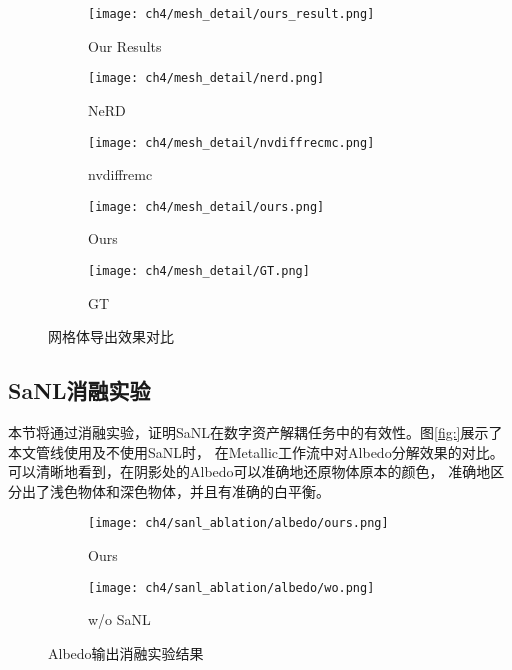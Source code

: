 \begin{figure}[H]
  \centering
  \begin{subfigure}[c]{0.32\textwidth}
    \centering
    \texttt{[image: ch4/mesh\_detail/ours\_result.png]}
    \caption{Our Results}
  \end{subfigure}
  \begin{subfigure}[c]{0.16\textwidth}
    \centering
    \texttt{[image: ch4/mesh\_detail/nerd.png]}
    \caption{NeRD}
  \end{subfigure}
  \hspace{0.1mm}
  \begin{subfigure}[c]{0.16\textwidth}
    \centering
    \texttt{[image: ch4/mesh\_detail/nvdiffrecmc.png]}
    \caption{nvdiffremc}
  \end{subfigure}
  \hspace{0.1mm}
  \begin{subfigure}[c]{0.16\textwidth}
    \centering
    \texttt{[image: ch4/mesh\_detail/ours.png]}
    \caption{Ours}
  \end{subfigure}
  \hspace{0.1mm}
  \begin{subfigure}[c]{0.16\textwidth}
    \centering
    \texttt{[image: ch4/mesh\_detail/GT.png]}
    \caption{GT}
  \end{subfigure}
  \caption{网格体导出效果对比}
  \label{fig:mesh_export_compare}
\end{figure}

\subsection{SaNL消融实验}

本节将通过消融实验，证明SaNL在数字资产解耦任务中的有效性。图\ref{fig:}展示了本文管线使用及不使用SaNL时，
在Metallic工作流中对Albedo分解效果的对比。可以清晰地看到，在阴影处的Albedo可以准确地还原物体原本的颜色，
准确地区分出了浅色物体和深色物体，并且有准确的白平衡。

\begin{figure}[H]
  \centering
  \begin{subfigure}[c]{0.47\textwidth}
    \centering
    \texttt{[image: ch4/sanl\_ablation/albedo/ours.png]}
    \caption{Ours}
  \end{subfigure}
  \begin{subfigure}[c]{0.47\textwidth}
    \centering
    \texttt{[image: ch4/sanl\_ablation/albedo/wo.png]}
    \caption{w/o SaNL}
  \end{subfigure}
  \caption{Albedo输出消融实验结果}
  \label{fig:albedo_ablation}
\end{figure}

